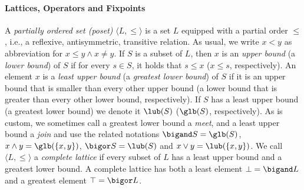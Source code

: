 \paragraph{Lattices, Operators and Fixpoints}

A \emph{partially ordered set (poset)} $\langle L,\leq\rangle$ is a set $L$ equipped with a partial order $\leq$, i.e., a reflexive, antisymmetric, transitive relation. 
As usual, we write $x<y$ as abbreviation for $x\leq y \land x\neq y$.
If $S$ is a subset of $L$, then $x$ is an \emph{upper bound} (a \emph{lower bound}) of $S$ if for every $s\in S$, it holds that $s\leq x$ ($x\leq s$, respectively).
An element $x$ is a \emph{least upper bound} (a \emph{greatest lower bound}) of $S$ if it is an upper bound that is smaller than every other upper bound (a lower bound that is greater than every other lower bound, respectively).
If $S$ has a least upper bound (a greatest lower bound) we denote it $\lub(S)$ ($\glb(S)$, respectively).
As is custom, we sometimes call a greatest lower bound a \emph{meet}, and a least upper bound a \emph{join} and use the related notations $\bigand S = \glb(S)$, $x\land y=\glb(\{x,y\})$, $\bigor S = \lub(S)$ and $x\lor y=\lub(\{x,y\})$.
 We call $\langle L,\leq\rangle$ a \emph{complete lattice}  if every subset of $L$ has a least upper bound and a greatest lower bound. 
A complete lattice has both a least element $\bot = \bigand L$ and a greatest element $\top = \bigor L$. 

